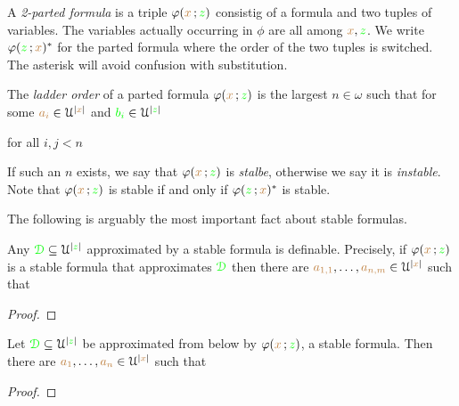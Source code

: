 \documentclass[creche.tex]{subfiles}
\begin{document}
\begin{definition}\label{def_parted-fla}
A \emph{2-parted formula\/} is a triple $\varphi({\color{brown} x}\,;{\color{green} z})$ consistig of a formula and two tuples of variables. The variables actually occurring in $\phi$ are all among ${\color{brown} x},{\color{green} z}$. We write $\varphi({\color{green} z}\,;{\color{brown} x})^*$ for the parted formula where the order of the two tuples is switched. The asterisk will avoid confusion with substitution.
\end{definition}


The \emph{ladder order\/} of a parted formula $\varphi({\color{brown} x}\,;{\color{green} z})$ is the largest $n\in\omega$ such that for some ${\color{brown} a_i}\in\EuScript U^{|{\color{brown} x}|}$ and ${\color{green} b_i}\in\EuScript U^{|{\color{green} z}|}$ 

\hfill for all $i,j<n$

If such an $n$ exists, we say that  $\varphi({\color{brown} x}\,;{\color{green} z})$ is \emph{stalbe}, otherwise we say it is \emph{instable}. Note that $\varphi({\color{brown} x}\,;{\color{green} z})$ is stable if and only if $\varphi({\color{green} z}\,;{\color{brown} x})^*$ is stable.

The following is arguably the most important fact about stable formulas.

\begin{theorem}
Any ${\color{green}\EuScript D}\subseteq\EuScript U^{|{\color{green} z}|}$ approximated by a stable formula is definable. Precisely, if $\varphi({\color{brown} x}\,;{\color{green} z})$ is a stable formula that approximates ${\color{green}\EuScript D}$ then there are ${\color{brown} a_{1,1}},\dots,{\color{brown} a_{n,m}}\in\EuScript U^{|{\color{brown} x}|}$ such that 




\end{theorem}

\begin{proof}

\end{proof}




\begin{lemma}
Let ${\color{green}\EuScript D}\subseteq\EuScript U^{|{\color{green} z}|}$ be approximated from below by  $\varphi({\color{brown} x}\,;{\color{green} z})$, a stable formula. Then there are ${\color{brown} a_1},\dots,{\color{brown} a_n}\in\EuScript U^{|{\color{brown} x}|}$ such that 




\end{lemma}

\begin{proof}

\end{proof}
\end{document}
